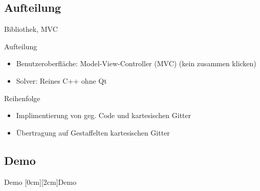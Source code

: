 \documentclass[t]{beamer}
\begin{document}
  \subsection{Aufteilung}
    \begin{frame}{Bibliothek, MVC}
    
  \begin{block}{Aufteilung}
    \begin{itemize}
      \item Benutzeroberfl\"ache: Model-View-Controller (MVC) (kein zusammen klicken)
      \item Solver: Reines C++ ohne Qt
    \end{itemize}
    \end{block}
    \begin{block}{Reihenfolge}
     \begin{itemize}
      \item Implimentierung von geg. Code und kartesischen Gitter
      \item \"Ubertragung auf Gestaffelten kartesischen Gitter
    \end{itemize}
    \end{block}
    
    \end{frame}
    \subsection{Demo}
    \begin{frame}{Demo}
    \hfill
      \center \raisebox{-4cm}[0cm][2cm]{\Huge{Demo}}
      \hfill
    \end{frame}
\end{document}

